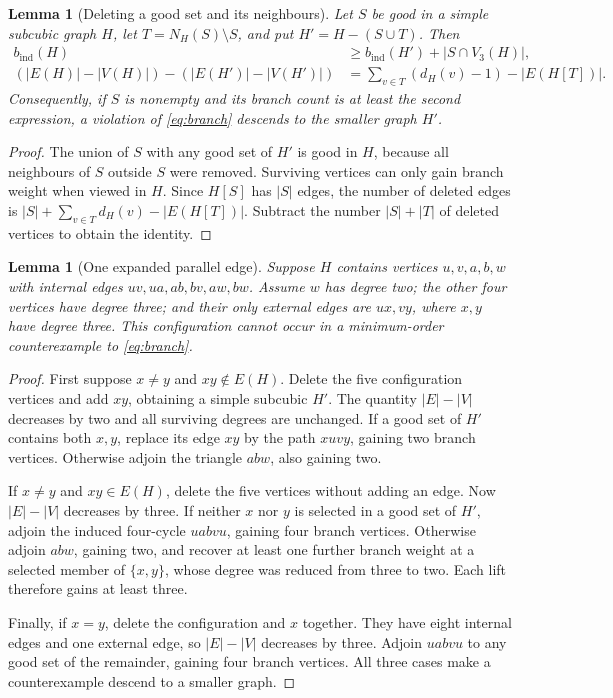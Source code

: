 \documentclass[11pt]{article}
\newtheorem{lemma}[theorem]{Lemma}
\newcommand{\bind}{b_{\mathrm{ind}}}
\begin{document}
\begin{lemma}[Deleting a good set and its neighbours]\label{lem:closed-neighbourhood}
Let $S$ be good in a simple subcubic graph $H$, let
$T=N_H(S)\setminus S$, and put $H'=H-(S\cup T)$. Then
\begin{align*}
 \bind(H)&\geq\bind(H')+|S\cap V_3(H)|,\\
 (|E(H)|-|V(H)|)-(|E(H')|-|V(H')|)
   &=\sum_{v\in T}(d_H(v)-1)-|E(H[T])|.
\end{align*}
Consequently, if $S$ is nonempty and its branch count is at least
the second expression, a violation of \eqref{eq:branch} descends
to the smaller graph $H'$.
\end{lemma}
\begin{proof}
The union of $S$ with any good set of $H'$ is good in $H$,
because all neighbours of $S$ outside $S$ were removed.
Surviving vertices can only gain branch weight when viewed in $H$.
Since $H[S]$ has $|S|$ edges, the number of deleted edges is
$|S|+\sum_{v\in T}d_H(v)-|E(H[T])|$. Subtract the number
$|S|+|T|$ of deleted vertices to obtain the identity.
\end{proof}

\begin{lemma}[One expanded parallel edge]\label{lem:house}
Suppose $H$ contains vertices $u,v,a,b,w$ with internal edges
$uv,ua,ab,bv,aw,bw$. Assume $w$ has degree two; the other four
vertices have degree three; and their only external edges are
$ux,vy$, where $x,y$ have degree three. This configuration cannot
occur in a minimum-order counterexample to \eqref{eq:branch}.
\end{lemma}
\begin{proof}
First suppose $x\ne y$ and $xy\notin E(H)$. Delete the five
configuration vertices and add $xy$, obtaining a simple subcubic
$H'$. The quantity $|E|-|V|$ decreases by two and all surviving
degrees are unchanged. If a good set of $H'$ contains both $x,y$,
replace its edge $xy$ by the path $xuvy$, gaining two branch
vertices. Otherwise adjoin the triangle $abw$, also gaining two.

If $x\ne y$ and $xy\in E(H)$, delete the five vertices without
adding an edge. Now $|E|-|V|$ decreases by three. If neither
$x$ nor $y$ is selected in a good set of $H'$, adjoin the induced
four-cycle $uabvu$, gaining four branch vertices. Otherwise adjoin
$abw$, gaining two, and recover at least one further branch weight
at a selected member of $\{x,y\}$, whose degree was reduced from
three to two. Each lift therefore gains at least three.

Finally, if $x=y$, delete the configuration and $x$ together.
They have eight internal edges and one external edge, so $|E|-|V|$
decreases by three. Adjoin $uabvu$ to any good set of the remainder,
gaining four branch vertices. All three cases make a counterexample
descend to a smaller graph.
\end{proof}
\end{document}
